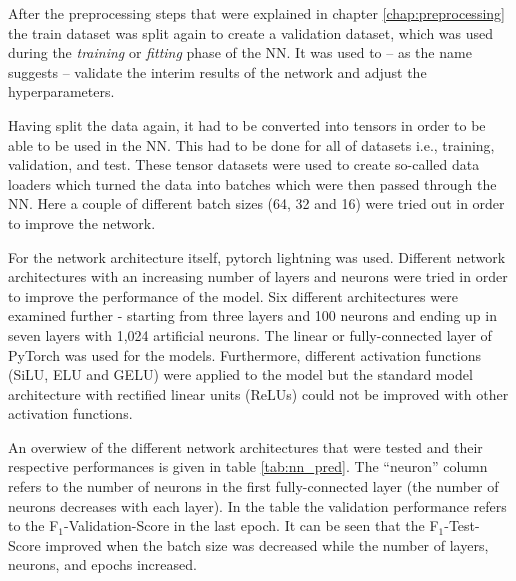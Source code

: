 After the preprocessing steps that were explained in chapter \ref{chap:preprocessing} the train dataset was split again to create a validation dataset, which was used during the \textit{training} or \textit{fitting} phase of the NN. It was used to -- as the name suggests -- validate the interim results of the network and adjust the hyperparameters. \citep[][p. 184]{TanPang-Ning2006}

Having split the data again, it had to be converted into tensors in order to be able to be used in the NN. This had to be done for all of datasets i.e., training, validation, and test. These tensor datasets were used to create so-called data loaders which turned the data into batches which were then passed through the NN. Here a couple of different batch sizes (64, 32 and 16) were tried out in order to improve the network.

For the network architecture itself, pytorch lightning was used. Different network architectures with an increasing number of layers and neurons were tried in order to improve the performance of the model. Six different architectures were examined further - starting from three layers and 100 neurons and ending up in seven layers with 1,024 artificial neurons. The linear or fully-connected layer of PyTorch was used for the models. \citep{PyTorch2019, PyTorch2021} Furthermore, different activation functions (SiLU, ELU and GELU) were applied to the model but the standard model architecture with rectified linear units (ReLUs) could not be improved with other activation functions.

An overwiew of the different network architectures that were tested and their respective performances is given in table \ref{tab:nn_pred}. The \enquote{neuron} column refers to the number of neurons in the first fully-connected layer (the number of neurons decreases with each layer). In the table the validation performance refers to the F$_1$-Validation-Score in the last epoch. It can be seen that the F$_1$-Test-Score improved when the batch size was decreased while the number of layers, neurons, and epochs increased.